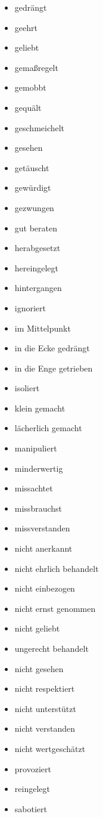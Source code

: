 \begin{multicols}{2}
\begin{itemize}
    \item gedrängt
    \item geehrt
    \item geliebt
    \item gemaßregelt
    \item gemobbt
    \item gequält
    \item geschmeichelt
    \item gesehen
    \item getäuscht
    \item gewürdigt
    \item gezwungen
    \item gut beraten
    \item herabgesetzt
    \item hereingelegt
    \item hintergangen
    \item ignoriert
    \item im Mittelpunkt
    \item in die Ecke gedrängt
    \item in die Enge getrieben
    \item isoliert
    \item klein gemacht
    \item lächerlich gemacht
    \item manipuliert
    \item minderwertig
    \item missachtet
    \item missbrauchst
    \item missverstanden
    \item nicht anerkannt
    \item nicht ehrlich behandelt
    \item nicht einbezogen
    \item nicht ernst genommen
    \item nicht geliebt
    \item ungerecht behandelt
    \item nicht gesehen
    \item nicht respektiert
    \item nicht unterstützt
    \item nicht verstanden
    \item nicht wertgeschätzt
    \item provoziert
    \item reingelegt
    \item sabotiert

\end{itemize}
\end{multicols}
